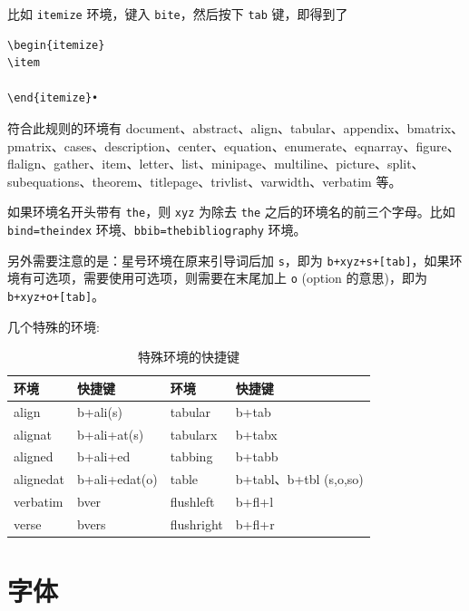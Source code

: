 \documentclass[geye,green,pad,cn]{elegantnote}
\begin{document}
 

比如 \lstinline{itemize} 环境，键入 \lstinline{bite}，然后按下 \lstinline{tab} 键，即得到了

\begin{lstlisting}[frame=single]
\begin{itemize}
\item

\end{itemize}•
\end{lstlisting}

符合此规则的环境有 document、abstract、align、tabular、appendix、bmatrix、pmatrix、cases、description、center、equation、enumerate、eqnarray、figure、flalign、gather、item、letter、list、minipage、multiline、picture、split、subequations、theorem、titlepage、trivlist、varwidth、verbatim 等。

\begin{note}
如果环境名开头带有 \lstinline{the}，则 \lstinline{xyz} 为除去 \lstinline{the} 之后的环境名的前三个字母。比如 \lstinline{bind=theindex} 环境、\lstinline{bbib=thebibliography} 环境。
\end{note}

另外需要注意的是：星号环境在原来引导词后加 \lstinline{s}，即为 \lstinline{b+xyz+s+[tab]}，如果环境有可选项，需要使用可选项，则需要在末尾加上 \lstinline{o} (option 的意思)，即为 \lstinline{b+xyz+o+[tab]}。

几个特殊的环境:

\begin{table}[!htbp]
\small
  \centering
  \caption{特殊环境的快捷键}
    \begin{tabular}{llll}
    \toprule
    环境    & 快捷键   & 环境    & 快捷键 \\
    \midrule
    align  & b+ali(s) & tabular  & b+tab \\
    alignat  & b+ali+at(s) & tabularx  & b+tabx \\
    aligned  & b+ali+ed & tabbing  & b+tabb \\
    alignedat  & b+ali+edat(o) & table  & b+tabl、b+tbl (s,o,so) \\
    verbatim  & bver  & flushleft  & b+fl+l \\
    verse  & bvers & flushright  & b+fl+r \\
    \bottomrule
    \end{tabular}%
  \label{tab:special environment}%
\end{table}%

\section{字体}
\end{document}
